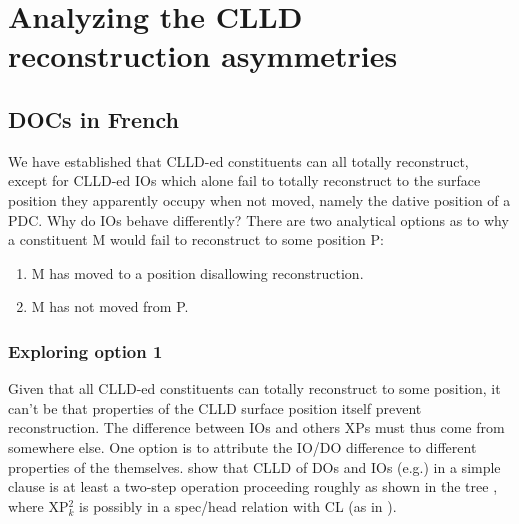 \documentclass[output=paper]{langsci/langscibook}
\begin{document}
\section{Analyzing the CLLD reconstruction asymmetries}

\subsection{\glspl{DOC} in French}

We have established that \gls{CLLD}-ed constituents can all totally
reconstruct,  except for \gls{CLLD}-ed \glspl{IO} which alone fail to totally
reconstruct to the surface position they apparently occupy when not moved,
namely the dative position of a \gls{PDC}. Why do \glspl{IO} behave
differently?  There are two analytical options as to  why a constituent M would
fail to reconstruct to some position P:

\begin{enumerate}
\item M has moved to a position disallowing reconstruction.
\item M has not moved from P.
\end{enumerate}

\subsubsection{Exploring option 1} Given  that all \gls{CLLD}-ed constituents can
totally reconstruct to some position, it can't be that properties of the
\gls{CLLD} surface position itself prevent
reconstruction. The difference between \glspl{IO} and others XPs must thus come
from somewhere else. One option is to attribute the IO/DO difference to
different properties of the  themselves.  \citet{Angelopoulo2017} show
that \gls{CLLD} of \glspl{DO} and \glspl{IO} (e.g.)
in a simple clause is at least a two-step operation proceeding roughly as shown
in the tree , where XP$_k^2$ is possibly in a spec/head relation
with CL (as in \citealt{Sportiche1996}).
\end{document}
